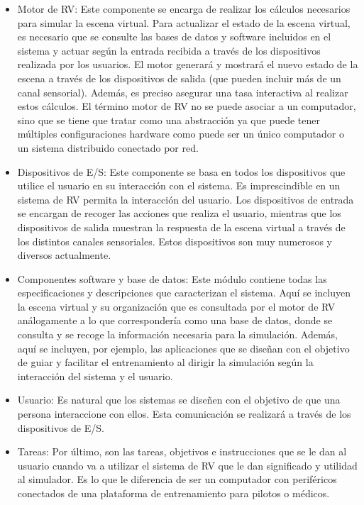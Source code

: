 \begin{itemize}
    \item Motor de \ac{RV}: Este componente se encarga de realizar los cálculos necesarios para simular la escena virtual. Para actualizar el estado de la escena virtual, es necesario que se consulte las bases de datos y software incluidos en el sistema y actuar según la entrada recibida a través de los dispositivos realizada por los usuarios. El motor generará y mostrará el nuevo estado de la escena a través de los dispositivos de salida (que pueden incluir más de un canal sensorial). Además, es preciso asegurar una tasa interactiva al realizar estos cálculos. El término motor de RV no se puede asociar a un computador, sino que se tiene que tratar como una abstracción ya que puede tener múltiples configuraciones hardware como puede ser un único computador o un sistema distribuido conectado por red.
    \item Dispositivos de \ac{E/S}: Este componente se basa en todos los dispositivos que utilice el usuario en su interacción con el sistema. Es imprescindible en un sistema de \ac{RV}  permita la interacción del usuario. Los dispositivos de entrada se encargan de recoger las acciones que realiza el usuario, mientras que los dispositivos de salida muestran la respuesta de la escena virtual a través de los distintos canales sensoriales. Estos dispositivos son muy numerosos y diversos actualmente.
    \item Componentes software y base de datos: Este módulo contiene todas las especificaciones y descripciones que caracterizan el sistema. Aquí se incluyen la escena virtual y su organización que es consultada por el motor de \ac{RV} análogamente a lo que correspondería como una base de datos, donde se consulta y se recoge la información necesaria para la simulación. Además, aquí se incluyen, por ejemplo, las aplicaciones que se diseñan con el objetivo de guiar y facilitar el entrenamiento al dirigir la simulación según la interacción del sistema y el usuario.
    \item Usuario: Es natural que los sistemas se diseñen con el objetivo de que una persona interaccione con ellos. Esta comunicación se realizará a través de los dispositivos de \ac{E/S}. 
    \item Tareas: Por último, son las tareas, objetivos e instrucciones que se le dan al usuario cuando va a utilizar el sistema de \ac{RV} que le dan significado y utilidad al simulador. Es lo que le diferencia de ser un computador con periféricos conectados de una plataforma de entrenamiento para pilotos o médicos. 
    
\end{itemize}

